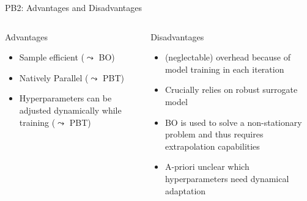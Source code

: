 \documentclass[aspectratio=169]{../latex_main/tntbeamer}  %
\begin{document}
\begin{frame}[c]{PB2: Advantages and Disadvantages}

\begin{columns}[T] %
\begin{column}{.48\textwidth}


\begin{block}{Advantages}
\begin{itemize}
  \item Sample efficient ($\leadsto$ BO)
  \item Natively Parallel ($\leadsto$ PBT)
  \item Hyperparameters can be adjusted dynamically while training ($\leadsto$ PBT)
\end{itemize}
\end{block}

\end{column}%

\hfill%
\pause 
\begin{column}{.48\textwidth}

\begin{block}{Disadvantages}
\begin{itemize}
  \item (neglectable) overhead because of model training in each iteration 
  \item Crucially relies on robust surrogate model
  \item BO is used to solve a non-stationary problem and thus requires extrapolation capabilities
  \item A-priori unclear which hyperparameters need dynamical adaptation 
\end{itemize}
\end{block}

\end{column}
\end{columns}

\end{frame}

\end{document}
